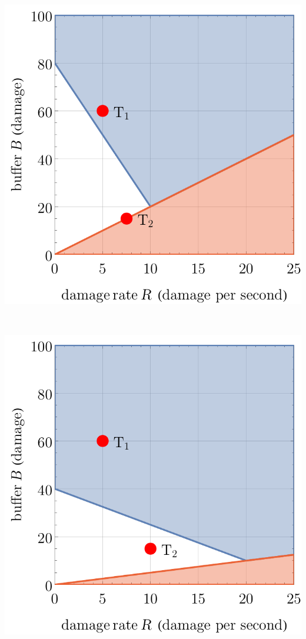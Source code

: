 \begin{center}
\begin{minipage}{.33\textwidth}
    \end{minipage}%
    \begin{minipage}{.33\textwidth}
        \centering
        \includegraphics[width=0.95\linewidth]{img/model3 s2.pdf}
        \label{fig:model3-s2}
    \end{minipage}\\
    \begin{minipage}{.33\textwidth}
        \centering
        \includegraphics[width=0.95\linewidth]{img/model3 g0.5.pdf}

\end{minipage}
\end{center}
